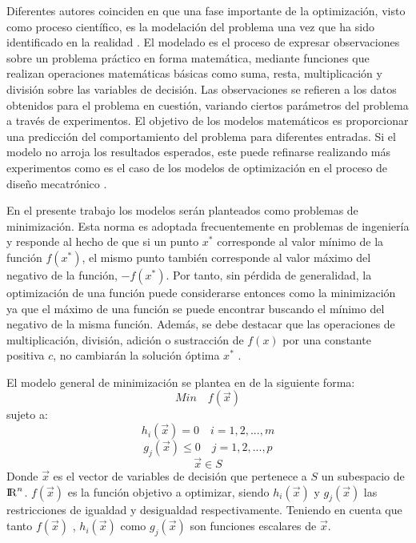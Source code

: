 Diferentes autores coinciden en que una fase importante de la optimización, visto como proceso científico, es la modelación del problema una vez que ha sido identificado en la realidad \cite{rao_engineering_2009} \cite{nocedal2006numerical} \cite{luenberger_linear_2015}. El modelado es el proceso de expresar observaciones sobre un problema práctico en forma matemática, mediante funciones que realizan operaciones matemáticas básicas como suma, resta, multiplicación y división sobre las variables de decisión. Las observaciones se refieren a los datos obtenidos para el problema en cuestión, variando ciertos parámetros del problema a través de experimentos. El objetivo de los modelos matemáticos es proporcionar una predicción del comportamiento del problema para diferentes entradas. Si el modelo no arroja los resultados esperados, este puede refinarse realizando más experimentos como es el caso de los modelos de optimización en el proceso de diseño mecatrónico \cite{arora_optimization:_2015}.  

En el presente trabajo los modelos serán planteados como problemas de minimización. Esta norma es adoptada frecuentemente en problemas de ingeniería y responde al hecho de que si un punto $x^*$ corresponde al valor mínimo de la función $f(x^*)$, el mismo punto también corresponde al valor máximo del negativo de la función, $-f(x^*)$. Por tanto, sin pérdida de generalidad, la optimización de una función puede considerarse entonces como la minimización ya que el máximo de una función se puede encontrar buscando el mínimo del negativo de la misma función. Además, se debe destacar que las operaciones de multiplicación, división, adición o sustracción de $f(x)$ por una constante positiva $c$, no cambiarán la solución óptima $x^*$ \cite{rao_engineering_2009}. 

El modelo general de minimización se plantea en \cite{luenberger_linear_2015} de la siguiente forma:
\begin{equation}
Min\quad  f(\vec{x})
\end{equation}
sujeto a:
\begin{equation}
h_{i}(\vec{x})=0 \quad i=1,2,...,m
\end{equation}
\begin{equation}
g_{j}(\vec{x}) \leq 0 \quad j=1,2,...,p 
\end{equation}
\begin{equation}
	\vec{x} \in S
\end{equation}
Donde $\vec{x}$ es el vector de variables de decisión que pertenece a $S$ un subespacio de ${\rm I\!R}^{n}$. $f(\vec{x})$  es la función objetivo a optimizar, siendo $h_{i}(\vec{x})$ y $g_{j}(\vec{x})$ las restricciones de igualdad y desigualdad respectivamente. Teniendo en cuenta que tanto $f(\vec{x})$ , $h_{i}(\vec{x})$ como $g_{j}(\vec{x})$ son funciones escalares de $\vec{x}$. 
